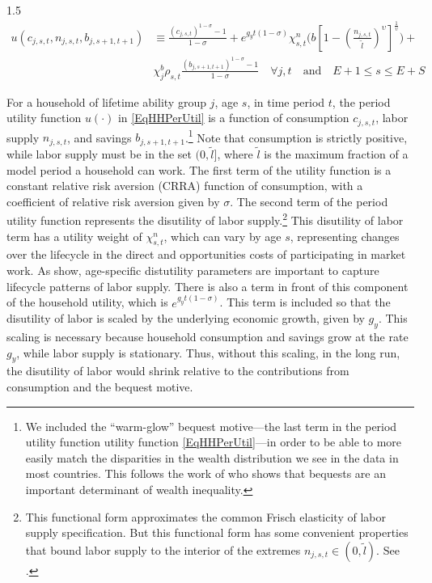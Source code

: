 \documentclass[letterpaper,12pt]{article}
\theoremstyle{definition}
\begin{document}
\begin{spacing}{1.5}
    \begin{equation}\label{EqHHPerUtil}
      \begin{split}
        u(c_{j,s,t},n_{j,s,t},b_{j,s+1,t+1}) &\equiv \frac{(c_{j,s,t})^{1-\sigma} - 1}{1-\sigma} + e^{g_y t(1-\sigma)}\chi^n_{s,t}\biggl(b\left[1 - \left(\frac{n_{j,s,t}}{\tilde{l}}\right)^\upsilon\right]^{\frac{1}{\upsilon}}\biggr) + \\
        &\chi^b_j \rho_{s,t} \frac{(b_{j,s+1,t+1})^{1-\sigma} - 1}{1-\sigma} \quad\forall j,t \quad\text{and}\quad E+1 \leq s \leq E+S
      \end{split}
    \end{equation}

    For a household of lifetime ability group $j$, age $s$, in time period $t$, the period utility function $u(\cdot)$ in \eqref{EqHHPerUtil} is a function of consumption $c_{j,s,t}$, labor supply $n_{j,s,t}$, and savings $b_{j,s+1,t+1}$.\footnote{We included the ``warm-glow'' bequest motive---the last term in the period utility function utility function \eqref{EqHHPerUtil}---in order to be able to more easily match the disparities in the wealth distribution we see in the data in most countries. This follows the work of \cite{DeNardi:2004} who shows that bequests are an important determinant of wealth inequality.} Note that consumption is strictly positive, while labor supply must be in the set $(0, \tilde{l}]$, where $\tilde{l}$ is the maximum fraction of a model period a household can work. The first term of the utility function is a constant relative risk aversion (CRRA) function of consumption, with a coefficient of relative risk aversion given by $\sigma$. The second term of the period utility function represents the disutility of labor supply.\footnote{This functional form approximates the common Frisch elasticity of labor supply specification. But this functional form has some convenient properties that bound labor supply to the interior of the extremes $n_{j,s,t}\in(0,\tilde{l})$. See \citet{EvansPhillips:2017}.} This disutility of labor term has a utility weight of $\chi^n_{s,t}$, which can vary by age $s$, representing changes over the lifecycle in the direct and opportunities costs of participating in market work. As \cite{RupertZanella:2015} show, age-specific distutility parameters are important to capture lifecycle patterns of labor supply.  There is also a term in front of this component of the household utility, which is $e^{g_yt(1-\sigma)}$. This term is included so that the disutility of labor is scaled by the underlying economic growth, given by $g_y$. This scaling is necessary because household consumption and savings grow at the rate $g_y$, while labor supply is stationary. Thus, without this scaling, in the long run, the disutility of labor would shrink relative to the contributions from consumption and the bequest motive.


\end{spacing}
\end{document}
